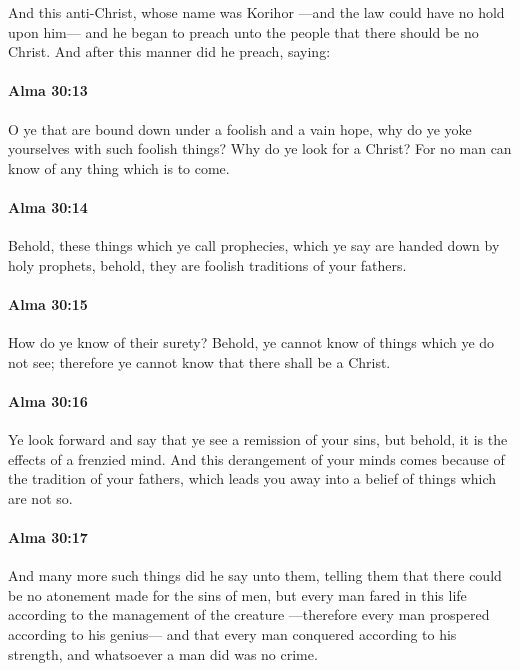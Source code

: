 			And this anti-Christ, whose name was Korihor
			---and the law could have no hold upon him---
			and he began to preach unto the people that there should be no Christ.
			And after this manner did he preach, saying:

		\paragraph{Alma 30:13} %
			\label{ALMA-30-13}

			O ye that are bound down under a foolish and a vain hope,
			why do ye yoke yourselves with such foolish things?
			Why do ye look for a Christ?
			For no man can know of any thing which is to come.

		\paragraph{Alma 30:14} %
			\label{ALMA-30-14}

			Behold, these things which ye call prophecies,
			which ye say are handed down by holy prophets,
			behold, they are foolish traditions of your fathers.

		\paragraph{Alma 30:15} %
			\label{ALMA-30-15}

			How do ye know of their surety?
			Behold, ye cannot know of things which ye do not see;
			therefore ye cannot know that there shall be a Christ.

		\paragraph{Alma 30:16} %
			\label{ALMA-30-16}

			Ye look forward and say that ye see a remission of your sins,
			but behold, it is the effects of a frenzied mind.
			And this derangement of your minds comes because of the tradition of your fathers,
			which leads you away into a belief of things which are not so.

		\paragraph{Alma 30:17} %
			\label{ALMA-30-17}

			And many more such things did he say unto them,
			telling them that there could be no atonement made for the sins of men,
			but every man fared in this life according to the management of the creature
			---therefore every man prospered according to his genius---
			and that every man conquered according to his strength,
			and whatsoever a man did was no crime.

